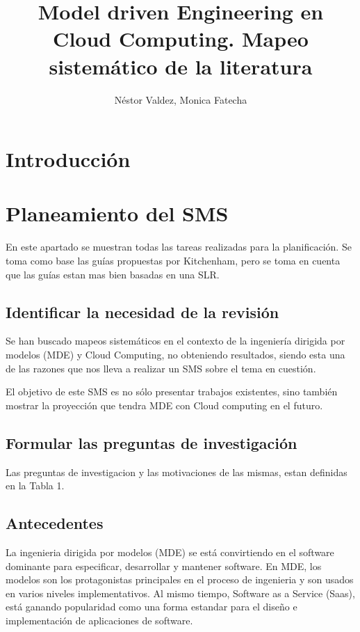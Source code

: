 \documentclass{llncs}
\begin{document}
\title{Model driven Engineering en Cloud Computing. Mapeo sistemático de la literatura}

\author{Néstor Valdez, Monica Fatecha}
\maketitle


\section{Introducción}\label{sec:Introduction}
\section{Planeamiento del SMS}\label{sec:Planning}
En este apartado se muestran todas las tareas realizadas para la planificación. Se toma como base las guías propuestas por
Kitchenham\cite{slr}, pero se toma en cuenta que las guías estan mas bien basadas en una SLR.
\subsection{Identificar la necesidad de la revisión}
Se han buscado mapeos sistemáticos en el contexto de la ingeniería dirigida por modelos (MDE) y Cloud Computing, no obteniendo
resultados, siendo esta una de las razones que nos lleva a realizar un SMS sobre el tema en cuestión.

El objetivo de este SMS es no sólo presentar trabajos existentes, sino también mostrar la proyección que tendra MDE con Cloud computing
en el futuro.
\subsection{Formular las preguntas de investigación}
Las preguntas de investigacion y las motivaciones de las mismas, estan definidas en la Tabla 1.

\subsection{Antecedentes}
La ingenieria dirigida por modelos (MDE) se está convirtiendo en el software dominante para especificar,
desarrollar y mantener software. En MDE, los modelos son los protagonistas principales en el proceso
de ingenieria y son usados en varios niveles implementativos.
Al mismo tiempo, Software as a Service (Saas), está ganando popularidad como una forma estandar para el diseño
e implementación de aplicaciones de software.
\end{document}
